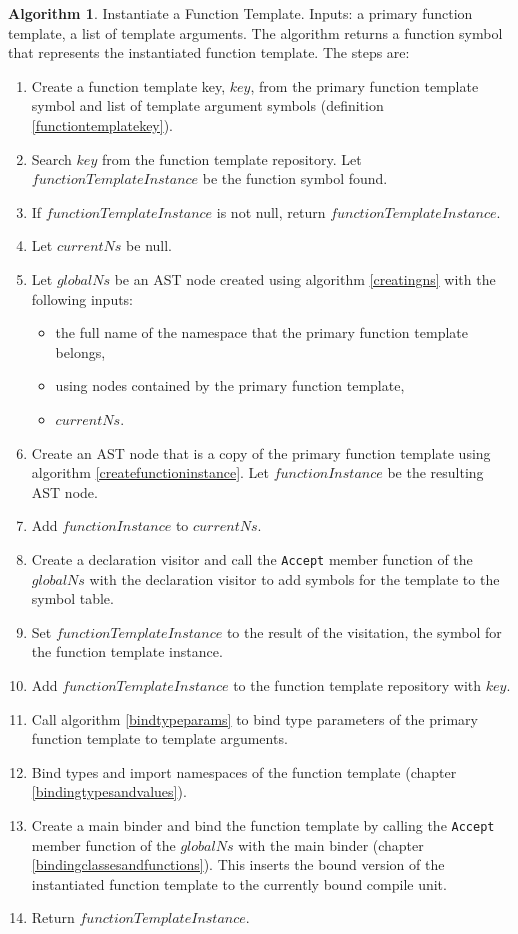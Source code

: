 \documentclass[a4paper,oneside,11pt]{book}
\theoremstyle{definition}
\newtheorem{algo}{Algorithm}[section]
\begin{document}
\begin{algo}\label{instantiatefunctiontemplate} Instantiate a Function Template. Inputs: a primary function template, a list of template arguments.
The algorithm returns a function symbol that represents the instantiated function template.
The steps are:
\begin{enumerate}
\item
Create a function template key, $key$, from the primary function template symbol and list of template argument symbols (definition \ref{functiontemplatekey}).
\item
Search $key$ from the function template repository. Let $functionTemplateInstance$ be the function symbol found.
\item
If $functionTemplateInstance$ is not null, return $functionTemplateInstance$.
\item
Let $currentNs$ be null.
\item
Let $globalNs$ be an AST node created using algorithm \ref{creatingns} with the following inputs:
\begin{itemize}
\item
the full name of the namespace that the primary function template belongs,
\item
using nodes contained by the primary function template,
\item
$currentNs$.
\end{itemize}
\item
Create an AST node that is a copy of the primary function template using algorithm \ref{createfunctioninstance}. Let $functionInstance$ be the resulting AST node.
\item
Add $functionInstance$ to $currentNs$.
\item
Create a declaration visitor and call the \verb|Accept| member function of the $globalNs$
with the declaration visitor to add symbols for the template to the symbol table.
\item
Set $functionTemplateInstance$ to the result of the visitation, the symbol for the function template instance.
\item
Add $functionTemplateInstance$ to the function template repository with $key$.
\item
Call algorithm \ref{bindtypeparams} to bind type parameters of the primary function template to template arguments.
\item
Bind types and import namespaces of the function template (chapter \ref{bindingtypesandvalues}).
\item
Create a main binder and bind the function template by calling the \verb|Accept| member function of the $globalNs$ with the main binder
(chapter \ref{bindingclassesandfunctions}). This inserts the bound version of the instantiated function template to the currently bound compile unit.
\item
Return $functionTemplateInstance$.
\end{enumerate}
\end{algo}
\end{document}
